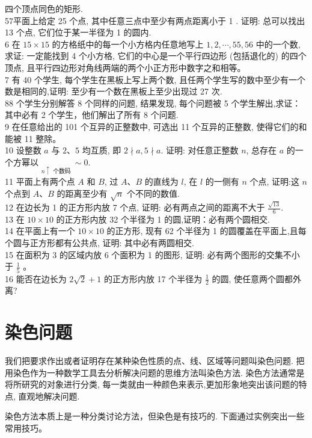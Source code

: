 \documentclass[10pt]{article}
\begin{document}
四个顶点同色的矩形.\\
57平面上给定 25 个点, 其中任意三点中至少有两点距离小于 1 . 证明: 总可以找出 13 个点, 它们位于某一半径为 1 的圆内.\\
6 在 $15 \times 15$ 的方格纸中的每一个小方格内任意地写上 $1,2, \cdots, 55,56$ 中的一个数, 求证: 一定能找到 4 个小方格, 它们的中心是一个平行四边形 (包括退化的) 的四个顶点, 且平行四边形对角线两端的两个小正方形中数字之和相等。\\
7 有 40 个学生, 每个学生在黑板上写上两个数, 且任两个学生写的数中至少有一个数是相同的,证明: 至少有一个数在黑板上至少出现过 27 次.\\
88 个学生分别解答 8 个同样的问题, 结果发现, 每个问题被 5 个学生解出,求证：其中必有 2 个学生，他们解出了所有 8 个问题.\\
9 在任意给出的 101 个互异的正整数中, 可选出 11 个互异的正整数, 使得它们的和能被 11 整除。\\
10 设整数 $a$ 与 $2 、 5$ 均互质, 即 $2 \nmid a, 5 \nmid a$. 证明: 对任意正整数 $n$, 总存在 $a$ 的一个方幂以 $\underset{n \uparrow \text { 个数码 }}{ } \sim 0$.\\
11 平面上有两个点 $A$ 和 $B$, 过 $A 、 B$ 的直线为 $l$, 在 $l$ 的一侧有 $n$ 个点, 证明:这 $n$ 个点到 $A 、 B$ 的距离至少有 $\sqrt{n}$ 个不同的数值.\\
12 在边长为 1 的正方形内放 7 个点, 证明: 必有两点之间的距离不大于 $\frac{\sqrt{13}}{6}$.\\
13 在 $10 \times 10$ 的正方形内放 32 个半径为 1 的圆,证明：必有两个圆相交.\\
14 在平面上有一个 $10 \times 10$ 的正方形, 现有 62 个半径为 1 的圆覆盖在平面上,且每个圆与正方形都有公共点, 证明: 其中必有两圆相交.\\
15 在面积为 3 的区域内放 6 个面积为 1 的图形, 证明: 必有两个图形的交集不小于 $\frac{1}{5}$ 。\\
16 能否在边长为 $2 \sqrt{2}+1$ 的正方形内放 17 个半径为 $\frac{1}{2}$ 的圆, 使任意两个圆都外离?

\section{染色问题}
我们把要求作出或者证明存在某种染色性质的点、线、区域等问题叫染色问题. 把用染色作为一种数学工具去分析解决问题的思维方法叫染色方法. 染色方法通常是将所研究的对象进行分类, 每一类就由一种颜色来表示,更加形象地突出该问题的特点, 直观地解决问题.

染色方法本质上是一种分类讨论方法，但染色是有技巧的. 下面通过实例突出一些常用技巧。
\end{document}
